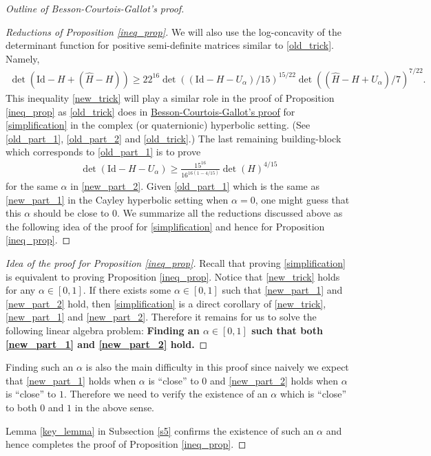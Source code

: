 \documentclass{article}
\newcommand{\id}{\mathrm{Id}}
\theoremstyle{definition}
\begin{document}
\begin{proof}[Outline of Besson-Courtois-Gallot's proof]
\begin{proof}[Reductions of Proposition \ref{ineq_prop}]
We will also use the log-concavity of the determinant function for positive semi-definite matrices similar to \eqref{old_trick}. Namely, 
\begin{align}\label{new_trick}\det(\id-H+(\widehat{H}-H))\geq 22^{16}\det((\id-H-U_\alpha)/15)^{15/22}\det((\widehat{H}-H+U_\alpha)/7)^{7/22}.\end{align}
This inequality \eqref{new_trick} will play a similar role in the proof of Proposition \ref{ineq_prop} as \eqref{old_trick} does in \hyperlink{BCG's proof sketch}{Besson-Courtois-Gallot's proof} for \eqref{simplification} in the complex (or quaternionic) hyperbolic setting. (See \eqref{old_part_1}, \eqref{old_part_2} and \eqref{old_trick}.) The last remaining building-block which corresponds to \eqref{old_part_1} is to prove 
\begin{align}\label{new_part_1}\det(\id-H-U_\alpha)\geq\frac{15^{16}}{16^{16(1-4/15)}}\det(H)^{4/15}\end{align}
for the same $\alpha$ in \eqref{new_part_2}. Given \eqref{old_part_1} which is the same as \eqref{new_part_1} in the Cayley hyperbolic setting when $\alpha=0$, one might guess that this $\alpha$ should be close to $0$. We summarize all the reductions discussed above as the following idea of the proof for \eqref{simplification} and hence for Proposition \ref{ineq_prop}.
\end{proof}
\begin{proof}[Idea of the proof for Proposition \ref{ineq_prop}]
Recall that proving \eqref{simplification} is equivalent to proving Proposition \ref{ineq_prop}.  Notice that \eqref{new_trick} holds for any $\alpha\in [0,1]$. If there exists some $\alpha\in[0,1]$ such that \eqref{new_part_1} and \eqref{new_part_2} hold, then \eqref{simplification} is a direct corollary of \eqref{new_trick}, \eqref{new_part_1} and \eqref{new_part_2}. Therefore it remains for us to solve the following linear algebra problem: \textbf{Finding an $\alpha\in [0,1]$ such that both \eqref{new_part_1} and \eqref{new_part_2} hold.} 
\end{proof}
Finding such an $\alpha$ is also the main difficulty in this proof since naively we expect that \eqref{new_part_1} holds when $\alpha$ is ``close'' to $0$ and \eqref{new_part_2} holds when $\alpha$ is ``close'' to $1$. Therefore we need to verify the existence of an $\alpha$ which is ``close'' to both $0$ and $1$ in the above sense. 

Lemma \ref{key_lemma} in Subsection \ref{s5} confirms the existence of such an $\alpha$ and hence completes the proof of Proposition \ref{ineq_prop}.

\end{proof}
\end{document}
